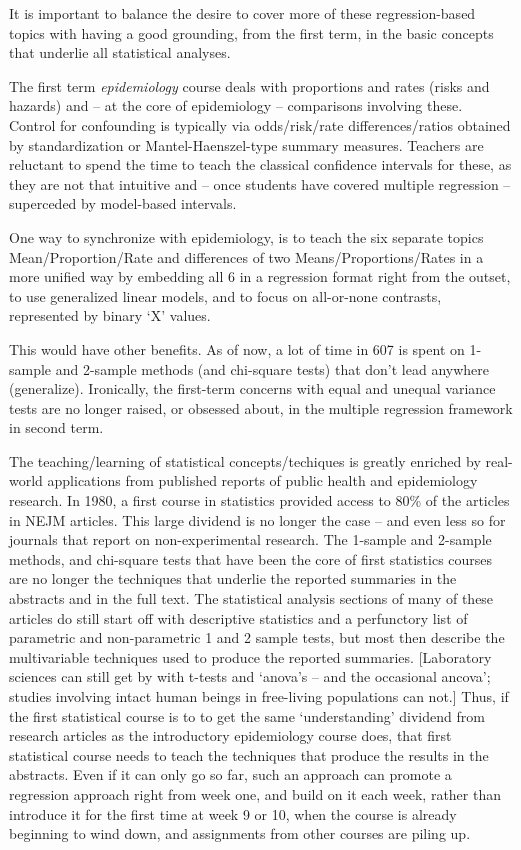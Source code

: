 \documentclass[]{book}
\begin{document}
It is important to balance the desire to cover more of these regression-based topics with having a good grounding, from the first term, in the basic concepts that underlie all statistical analyses.

The first term \emph{epidemiology} course deals with proportions and rates (risks and hazards) and -- at the core of epidemiology -- comparisons involving these. Control for confounding is typically via odds/risk/rate differences/ratios obtained by standardization or Mantel-Haenszel-type summary measures. Teachers are reluctant to spend the time to teach the classical confidence intervals for these, as they are not that intuitive and -- once students have covered multiple regression -- superceded by model-based intervals.

One way to synchronize with epidemiology, is to teach the six separate topics Mean/Proportion/Rate and differences of two Means/Proportions/Rates in a more unified way by embedding all 6 in a regression format right from the outset, to use generalized linear models, and to focus on all-or-none contrasts, represented by binary `X' values.

This would have other benefits. As of now, a lot of time in 607 is spent on 1-sample and 2-sample methods (and chi-square tests) that don't lead anywhere (generalize). Ironically, the first-term concerns with equal and unequal variance tests are no longer raised, or obsessed about, in the multiple regression framework in second term.

The teaching/learning of statistical concepts/techiques is greatly enriched by real-world applications from published reports of public health and epidemiology research. In 1980, a first course in statistics provided access to 80\% of the articles in NEJM articles. This large dividend is no longer the case -- and even less so for journals that report on non-experimental research. The 1-sample and 2-sample methods, and chi-square tests that have been the core of first statistics courses are no longer the techniques that underlie the reported summaries in the abstracts and in the full text. The statistical analysis sections of
many of these articles do still start off with descriptive statistics and a perfunctory list of parametric and non-parametric 1 and 2 sample tests, but most then describe the multivariable techniques used to produce the reported summaries. {[}Laboratory sciences can still get by with t-tests and `anova's -- and the occasional ancova'; studies involving intact human beings in free-living populations can not.{]} Thus, if the first statistical course is to to get the same `understanding' dividend from research articles as the introductory epidemiology course does, that first statistical course needs to teach the techniques that produce the results in the abstracts. Even if it can only go so far, such an approach can promote a regression approach right from week one, and build on it each week, rather than introduce it for the first time at week 9 or 10, when the course is already beginning to wind down, and assignments from other courses are piling up.
\end{document}
